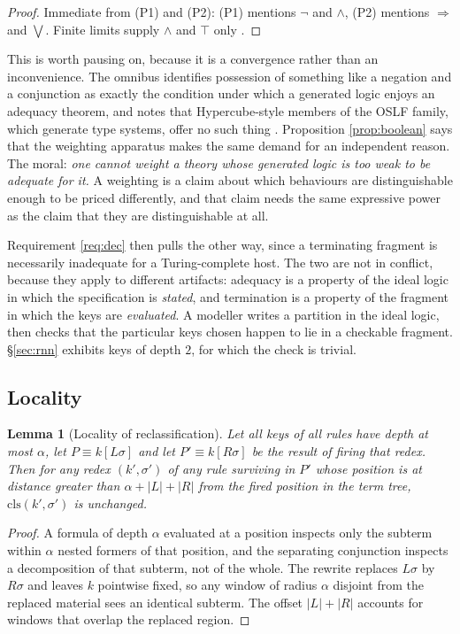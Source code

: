 \documentclass[11pt,a4paper]{article}
\theoremstyle{plain}
\newtheorem{lemma}[theorem]{Lemma}
\theoremstyle{definition}
\theoremstyle{remark}
\newcommand{\class}{\mathrm{cls}}
\begin{document}
\begin{proof}
Immediate from (P1) and (P2): (P1) mentions $\neg$ and $\wedge$, (P2) mentions $\Rightarrow$ and
$\bigvee$. Finite limits supply $\wedge$ and $\top$ only \cite{omnibus}.
\end{proof}

This is worth pausing on, because it is a convergence rather than an inconvenience. The omnibus
identifies possession of something like a negation and a conjunction as exactly the condition under
which a generated logic enjoys an adequacy theorem, and notes that Hypercube-style members of the
OSLF family, which generate type systems, offer no such thing \cite{omnibus}. Proposition
\ref{prop:boolean} says that the weighting apparatus makes the same demand for an independent
reason. The moral: \emph{one cannot weight a theory whose generated logic is too weak to be
adequate for it.} A weighting is a claim about which behaviours are distinguishable enough to be
priced differently, and that claim needs the same expressive power as the claim that they are
distinguishable at all.

Requirement \ref{req:dec} then pulls the other way, since a terminating fragment is necessarily
inadequate for a Turing-complete host. The two are not in conflict, because they apply to different
artifacts: adequacy is a property of the ideal logic in which the specification is \emph{stated},
and termination is a property of the fragment in which the keys are \emph{evaluated}. A modeller
writes a partition in the ideal logic, then checks that the particular keys chosen happen to lie in
a checkable fragment. \S\ref{sec:rnn} exhibits keys of depth $2$, for which the check is trivial.

\subsection{Locality}

\begin{lemma}[Locality of reclassification]
\label{lem:locality}
Let all keys of all rules have depth at most $\alpha$, let $P \equiv k[L\sigma]$ and let
$P' \equiv k[R\sigma]$ be the result of firing that redex. Then for any redex $(k', \sigma')$ of any
rule surviving in $P'$ whose position is at distance greater than $\alpha + |L| + |R|$ from the fired
position in the term tree, $\class(k',\sigma')$ is unchanged.
\end{lemma}

\begin{proof}
A formula of depth $\alpha$ evaluated at a position inspects only the subterm within $\alpha$ nested
formers of that position, and the separating conjunction inspects a decomposition of that subterm,
not of the whole. The rewrite replaces $L\sigma$ by $R\sigma$ and leaves $k$ pointwise fixed, so any
window of radius $\alpha$ disjoint from the replaced material sees an identical subterm. The offset
$|L| + |R|$ accounts for windows that overlap the replaced region.
\end{proof}
\end{document}
